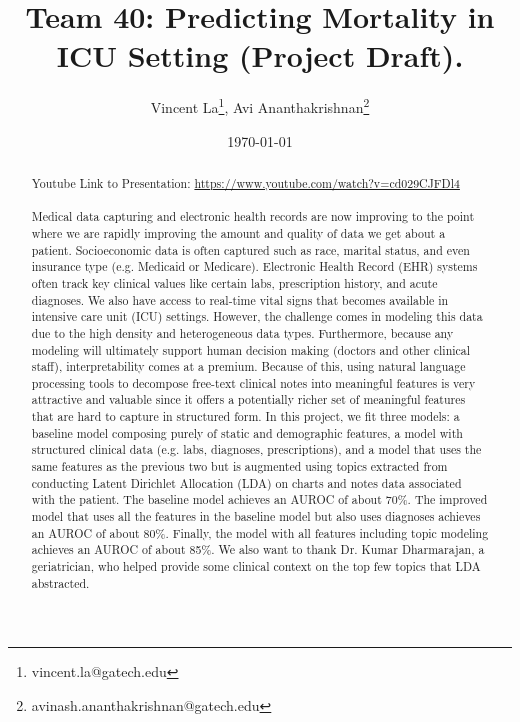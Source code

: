 \documentclass[12pt, final]{article}
\renewcommand{\thefootnote}{$\star$}
\begin{document}
\title{Team 40: Predicting Mortality in ICU Setting (Project Draft).}

\date{\today}

\renewcommand{\thefootnote}{$\dag$}
\author{Vincent La\footnote{vincent.la@gatech.edu}, Avi Ananthakrishnan\footnote{avinash.ananthakrishnan@gatech.edu}}

\maketitle

\begin{abstract}
Youtube Link to Presentation: \href{https://www.youtube.com/watch?v=cd029CJFDl4}{https://www.youtube.com/watch?v=cd029CJFDl4}
\\
\\
Medical data capturing and electronic health records are now improving to the point where we are rapidly improving the amount and quality of data we get about a patient. Socioeconomic data is often captured such as race, marital status, and even insurance type (e.g. Medicaid or Medicare). Electronic Health Record (EHR) systems often track key clinical values like certain labs, prescription history, and acute diagnoses. We also have access to real-time vital signs that becomes available in intensive care unit (ICU) settings. However, the challenge comes in modeling this data due to the high density and heterogeneous data types. Furthermore, because any modeling will ultimately support human decision making (doctors and other clinical staff), interpretability comes at a premium. Because of this, using natural language processing tools to decompose free-text clinical notes into meaningful features is very attractive and valuable since it offers a potentially richer set of meaningful features that are hard to capture in structured form. In this project, we fit three models: a baseline model composing purely of static and demographic features, a model with structured clinical data (e.g. labs, diagnoses, prescriptions), and a model that uses the same features as the previous two but is augmented using topics extracted from conducting Latent Dirichlet Allocation (LDA) on charts and notes data associated with the patient. The baseline model achieves an AUROC of about 70\%. The improved model that uses all the features in the baseline model but also uses diagnoses achieves an AUROC of about 80\%. Finally, the model with all features including topic modeling achieves an AUROC of about 85\%. We also want to thank Dr. Kumar Dharmarajan, a geriatrician, who helped provide some clinical context on the top few topics that LDA abstracted.
\end{abstract} 
\end{document}
